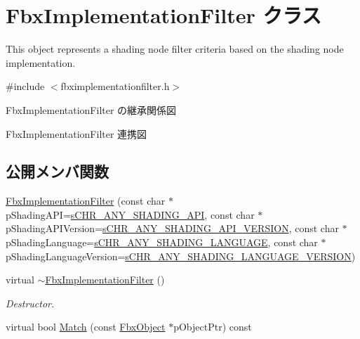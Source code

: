 \hypertarget{class_fbx_implementation_filter}{}\section{Fbx\+Implementation\+Filter クラス}
\label{class_fbx_implementation_filter}


This object represents a shading node filter criteria based on the shading node implementation.  




{\ttfamily \#include $<$fbximplementationfilter.\+h$>$}



Fbx\+Implementation\+Filter の継承関係図


Fbx\+Implementation\+Filter 連携図
\subsection*{公開メンバ関数}
\begin{DoxyCompactItemize}
\item 
\hyperlink{class_fbx_implementation_filter_ab53b0ef25ada946751aaa8df6490809b}{Fbx\+Implementation\+Filter} (const char $\ast$p\+Shading\+A\+PI=\hyperlink{class_fbx_implementation_filter_a596d1d4050df2c9a608520ee6dd6bdfd}{s\+C\+H\+R\+\_\+\+A\+N\+Y\+\_\+\+S\+H\+A\+D\+I\+N\+G\+\_\+\+A\+PI}, const char $\ast$p\+Shading\+A\+P\+I\+Version=\hyperlink{class_fbx_implementation_filter_ac81682276ccaaf912fa5795b1b90110d}{s\+C\+H\+R\+\_\+\+A\+N\+Y\+\_\+\+S\+H\+A\+D\+I\+N\+G\+\_\+\+A\+P\+I\+\_\+\+V\+E\+R\+S\+I\+ON}, const char $\ast$p\+Shading\+Language=\hyperlink{class_fbx_implementation_filter_a682a04bbd0db2b4ff00e13cecb27badc}{s\+C\+H\+R\+\_\+\+A\+N\+Y\+\_\+\+S\+H\+A\+D\+I\+N\+G\+\_\+\+L\+A\+N\+G\+U\+A\+GE}, const char $\ast$p\+Shading\+Language\+Version=\hyperlink{class_fbx_implementation_filter_af479f36e72bb5dd80c400edbab0ceafe}{s\+C\+H\+R\+\_\+\+A\+N\+Y\+\_\+\+S\+H\+A\+D\+I\+N\+G\+\_\+\+L\+A\+N\+G\+U\+A\+G\+E\+\_\+\+V\+E\+R\+S\+I\+ON})
\item 
virtual \hyperlink{class_fbx_implementation_filter_a21f8f8c4176a19d38ed1280adc1d104b}{$\sim$\+Fbx\+Implementation\+Filter} ()
\begin{DoxyCompactList}\small\item\em Destructor. \end{DoxyCompactList}\item 
virtual bool \hyperlink{class_fbx_implementation_filter_a59ab32592ea71f1853f1cc5f641a341d}{Match} (const \hyperlink{class_fbx_object}{Fbx\+Object} $\ast$p\+Object\+Ptr) const
\end{DoxyCompactItemize}
